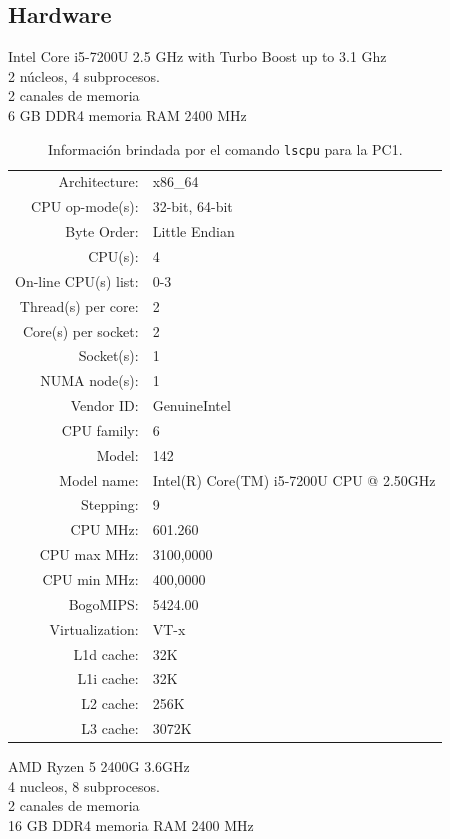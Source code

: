 \documentclass{article}
\begin{document}
\subsection{Hardware}
\begin{description}[align=right]
    \item [PC1] Intel Core i5-7200U 2.5 GHz with Turbo Boost up to 3.1 Ghz\\
        2 núcleos, 4 subprocesos.\\
        2 canales de memoria\\
        6 GB DDR4 memoria RAM  2400 MHz

        \begin{table}[H] 
            \centering
            \begin{tabular}{ r l } 
                Architecture: & x86\_64\\ 
                CPU op-mode(s): & 32-bit, 64-bit\\ 
                Byte Order: & Little Endian \\ 
                CPU(s): & 4\\ 
                On-line CPU(s) list: & 0-3 \\ 
                Thread(s) per core: & 2 \\ 
                Core(s) per socket: & 2 \\
                Socket(s): & 1 \\
                NUMA node(s): & 1\\ 
                Vendor ID: & GenuineIntel \\
                CPU family: & 6 \\
                Model: & 142 \\
                Model name: & Intel(R) Core(TM) i5-7200U CPU @ 2.50GHz \\
                Stepping: & 9 \\
                CPU MHz: & 601.260 \\
                CPU max MHz: & 3100,0000 \\
                CPU min MHz: & 400,0000 \\
                BogoMIPS: & 5424.00 \\
                Virtualization: & VT-x \\
                L1d cache: & 32K \\
                L1i cache: & 32K \\
                L2 cache: & 256K \\
                L3 cache: & 3072K\\
            \end{tabular}
            \caption{Información brindada por el comando \texttt{lscpu} para la PC1.}
        \end{table}
    \item [PC2] AMD Ryzen 5 2400G 3.6GHz\\
        4 nucleos, 8 subprocesos.\\
        2 canales de memoria\\
        16 GB DDR4 memoria RAM 2400 MHz


\end{description}
\end{document}
